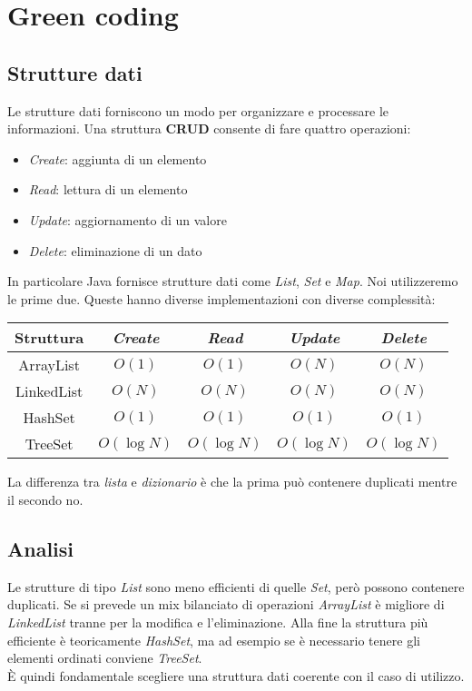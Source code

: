 \newpage
\section{Green coding}
\subsection{Strutture dati}
Le strutture dati forniscono un modo per organizzare e processare le informazioni. Una struttura \textbf{CRUD} consente di fare quattro operazioni:
\begin{itemize}
	\item \textit{Create}: aggiunta di un elemento
	\item \textit{Read}: lettura di un elemento
	\item \textit{Update}: aggiornamento di un valore
	\item \textit{Delete}: eliminazione di un dato
\end{itemize}
In particolare Java fornisce strutture dati come \textit{List}, \textit{Set} e \textit{Map}. Noi utilizzeremo le prime due. Queste hanno diverse implementazioni con diverse complessità:
\begin{table}[!h]
	\centering
	\begin{tabular}{|c|c|c|c|c|}
		\hline
		\textbf{Struttura} & \textit{Create} & \textit{Read} & \textit{Update} & \textit{Delete} \\
		\hline
		ArrayList & $O(1)$ & $O(1)$ & $O(N)$ & $O(N)$ \\
		LinkedList & $O(N)$ & $O(N)$ & $O(N)$ & $O(N)$\\
		HashSet & $O(1)$ & $O(1)$ & $O(1)$ & $O(1)$\\
		TreeSet & $O(\log N)$ & $O(\log N)$ & $O(\log N)$ & $O(\log N)$\\
		\hline
	\end{tabular}
\end{table}
\begin{note}
	La differenza tra \textit{lista} e \textit{dizionario} è che la prima può contenere duplicati mentre il secondo no.
\end{note}

\subsection{Analisi}
Le strutture di tipo \textit{List} sono meno efficienti di quelle \textit{Set}, però possono contenere duplicati. Se si prevede un mix bilanciato di operazioni \textit{ArrayList} è migliore di \textit{LinkedList} tranne per la modifica e l'eliminazione. Alla fine la struttura più efficiente è teoricamente \textit{HashSet}, ma ad esempio se è necessario tenere gli elementi ordinati conviene \textit{TreeSet}.\\
È quindi fondamentale scegliere una struttura dati coerente con il caso di utilizzo.